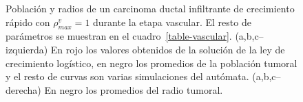\begin{figure}[p]
\begin{center}
\end{center}\vspace*{-0.6cm}
\caption[Poblaci\'on y radios de un carcinoma ductal infiltrante de crecimiento r\'apido con $\rho_{max}^v=1$ durante la etapa vascular]{Poblaci\'on y radios de un carcinoma ductal infiltrante de crecimiento r\'apido con $\rho_{max}^v=1$ durante la etapa vascular. El resto de par\'ametros se muestran en el cuadro~\ref{table-vascular}. (a,b,c--izquierda) En rojo los valores obtenidos de la soluci\'on de la ley de crecimiento log\'istico, en negro los promedios de la poblaci\'on tumoral y el resto de curvas son varias simulaciones del aut\'omata. (a,b,c--derecha) En negro los promedios del radio tumoral.}
\label{graph-vascular-simulations}
\end{figure}

\begin{figure}[p]
\begin{center}
\vspace*{-0.2cm}

\end{center}
\end{figure}
